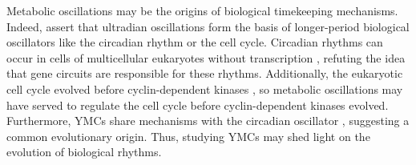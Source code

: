 
Metabolic oscillations may be the origins of biological timekeeping mechanisms.
Indeed, \citet{lloydRedoxRhythmicityClocks2007} assert that ultradian oscillations form the basis of longer-period biological oscillators like the circadian rhythm or the cell cycle.
Circadian rhythms can occur in cells of multicellular eukaryotes without transcription \citep{oneillCircadianRhythmsPersist2011}, refuting the idea that gene circuits are responsible for these rhythms.
Additionally, the eukaryotic cell cycle evolved before cyclin-dependent kinases \citep{papagiannakisAutonomousMetabolicOscillations2017}, so metabolic oscillations may have served to regulate the cell cycle before cyclin-dependent kinases evolved.
Furthermore, YMCs share mechanisms with the circadian oscillator \citep{caustonMetabolicCyclesYeast2015,arataQuantitativeStudiesCellDivision2019}, suggesting a common evolutionary origin.
Thus, studying YMCs may shed light on the evolution of biological rhythms.

